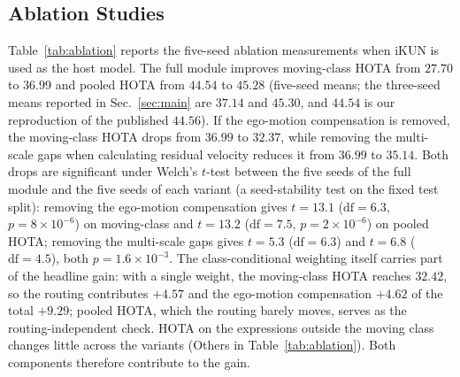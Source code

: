 \documentclass{article}
\begin{document}
\subsection{Ablation Studies}
\label{sec:ablation}
Table~\ref{tab:ablation} reports the five-seed ablation measurements when iKUN is used as the host model. The full module improves moving-class HOTA from $27.70$ to $36.99$ and pooled HOTA from $44.54$ to $45.28$ (five-seed means; the three-seed means reported in Sec.~\ref{sec:main} are $37.14$ and $45.30$, and $44.54$ is our reproduction of the published $44.56$). If the ego-motion compensation is removed, the moving-class HOTA drops from $36.99$ to $32.37$, while removing the multi-scale gaps when calculating residual velocity reduces it from $36.99$ to $35.14$. Both drops are significant under Welch's $t$-test between the five seeds of the full module and the five seeds of each variant (a seed-stability test on the fixed test split): removing the ego-motion compensation gives $t{=}13.1$ ($\mathrm{df}{=}6.3$, $p{=}8{\times}10^{-6}$) on moving-class and $t{=}13.2$ ($\mathrm{df}{=}7.5$, $p{=}2{\times}10^{-6}$) on pooled HOTA; removing the multi-scale gaps gives $t{=}5.3$ ($\mathrm{df}{=}6.3$) and $t{=}6.8$ ($\mathrm{df}{=}4.5$), both $p{=}1.6{\times}10^{-3}$. The class-conditional weighting itself carries part of the headline gain: with a single weight, the moving-class HOTA reaches $32.42$, so the routing contributes $+4.57$ and the ego-motion compensation $+4.62$ of the total $+9.29$; pooled HOTA, which the routing barely moves, serves as the routing-independent check. HOTA on the expressions outside the moving class changes little across the variants (Others in Table~\ref{tab:ablation}). Both components therefore contribute to the gain.
\end{document}

